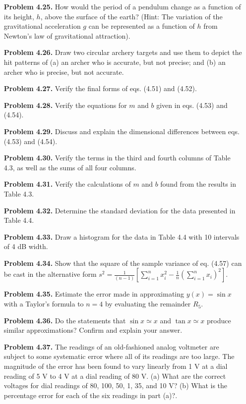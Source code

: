 \begin{enumerate}
    \item[\textbf{Problem 4.25.}] How would the period of a pendulum change as a function of its height, $h$, above the surface of the earth? (Hint: The variation of the gravitational acceleration $g$ can be represented as a function of $h$ from Newton’s law of gravitational attraction).
    \item[\textbf{Problem 4.26.}] Draw two circular archery targets and use them to depict the hit patterns of (a) an archer who is accurate, but not precise; and (b) an archer who is precise, but not accurate.
    \item[\textbf{Problem 4.27.}] Verify the final forms of eqs. (4.51) and (4.52).
    \item[\textbf{Problem 4.28.}] Verify the equations for $m$ and $b$ given in eqs. (4.53) and (4.54).
    \item[\textbf{Problem 4.29.}] Discuss and explain the dimensional differences between eqs. (4.53) and (4.54).
    \item[\textbf{Problem 4.30.}] Verify the terms in the third and fourth columns of Table 4.3, as well as the sums of all four columns.
    \item[\textbf{Problem 4.31.}] Verify the calculations of $m$ and $b$ found from the results in Table 4.3.
    \item[\textbf{Problem 4.32.}] Determine the standard deviation for the data presented in Table 4.4.
    \item[\textbf{Problem 4.33.}] Draw a histogram for the data in Table 4.4 with 10 intervals of 4 dB width.
    \item[\textbf{Problem 4.34.}] Show that the square of the sample variance of eq. (4.57) can be cast in the alternative form $s^2 = \frac{1}{(n-1)} \left[ \sum_{i=1}^n x_i^2 - \frac{1}{n} \left(\sum_{i=1}^n x_i\right)^2 \right]$.
    \item[\textbf{Problem 4.35.}] Estimate the error made in approximating $y(x) = \sin x$ with a Taylor’s formula to $n = 4$ by evaluating the remainder $R_5$.
    \item[\textbf{Problem 4.36.}] Do the statements that $\sin x \simeq x$ and $\tan x \simeq x$ produce similar approximations? Confirm and explain your answer.
    \item[\textbf{Problem 4.37.}] The readings of an old-fashioned analog voltmeter are subject to some systematic error where all of its readings are too large. The magnitude of the error has been found to vary linearly from 1 V at a dial reading of 5 V to 4 V at a dial reading of 80 V. (a) What are the correct voltages for dial readings of 80, 100, 50, 1, 35, and 10 V? (b) What is the percentage error for each of the six readings in part (a)?.

\end{enumerate}
